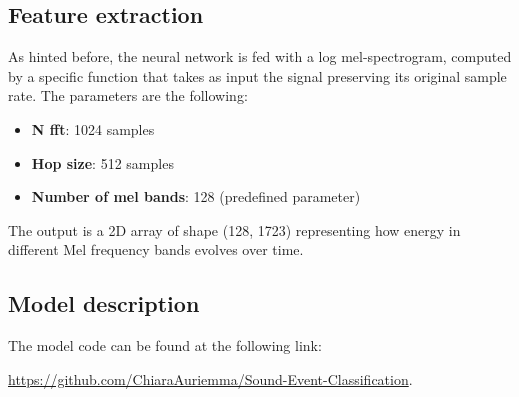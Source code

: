 \documentclass{article}
\begin{document}
\begin{sloppy}
\subsection{Feature extraction}
\label{sec:feature_extraction}
As hinted before, the neural network is fed with a log mel-spectrogram, computed by a specific function that takes as input
the signal preserving its original sample rate. The parameters are the following:
\begin{itemize}
    \item \textbf{N fft}: 1024 samples
    \item \textbf{Hop size}: 512 samples
    \item \textbf{Number of mel bands}: 128 (predefined parameter)
\end{itemize}
The output is a 2D array of shape (128, 1723) representing how energy in different Mel frequency bands evolves over time.

\subsection{Model description}
\label{sec:model_description}
The model code can be found at the following link:

\url{https://github.com/ChiaraAuriemma/Sound-Event-Classification}.



\end{sloppy}
\end{document}
